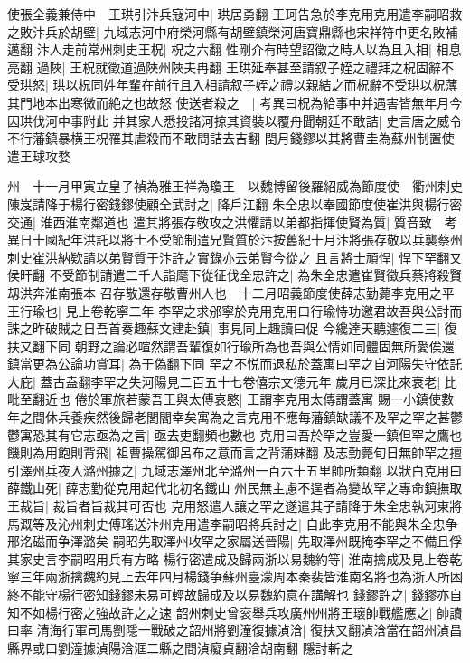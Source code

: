 使張全義兼侍中　王珙引汴兵寇河中|{
	珙居勇翻}
王珂告急於李克用克用遣李嗣昭救之敗汴兵於胡壁|{
	九域志河中府榮河縣有胡壁鎮榮河唐寶鼎縣也宋祥符中更名敗補邁翻}
汴人走前常州刺史王柷|{
	柷之六翻}
性剛介有時望詔徵之時人以為且入相|{
	相息亮翻}
過陜|{
	王柷就徵道過陜州陜夫冉翻}
王珙延奉甚至請叙子姪之禮拜之柷固辭不受珙怒|{
	珙以柷同姓年輩在前行且入相請叙子姪之禮以親結之而柷辭不受珙以柷薄其門地本出寒微而絶之也故怒}
使送者殺之　|{
	考異曰柷為給事中并遇害皆無年月今因珙伐河中事附此}
并其家人悉投諸河掠其資裝以覆舟聞朝廷不敢詰|{
	史言唐之威令不行藩鎮暴横王柷罹其虐殺而不敢問詰去吉翻}
閏月錢鏐以其將曹圭為蘇州制置使遣王球攻婺

州　十一月甲寅立皇子禎為雅王祥為瓊王　以魏博留後羅紹威為節度使　衢州刺史陳岌請降于楊行密錢鏐使顧全武討之|{
	降戶江翻}
朱全忠以奉國節度使崔洪與楊行密交通|{
	淮西淮南鄰道也}
遣其將張存敬攻之洪懼請以弟都指揮使賢為質|{
	質音致　考異日十國紀年洪託以將士不受節制遣兄賢質於汴按舊紀十月汴將張存敬以兵襲蔡州刺史崔洪納欵請以弟賢質于汴許之實錄亦云弟賢今從之}
且言將士頑悍|{
	悍下罕翻又侯旰翻}
不受節制請遣二千人詣麾下從征伐全忠許之|{
	為朱全忠遣崔賢徵兵蔡將殺賢刼洪奔淮南張本}
召存敬還存敬曹州人也　十二月昭義節度使薛志勤薨李克用之平王行瑜也|{
	見上卷乾寧二年}
李罕之求邠寧於克用克用曰行瑜恃功邀君故吾與公討而誅之昨破賊之日吾首奏趣蘇文建赴鎮|{
	事見同上趣讀曰促}
今纔達天聽遽復二三|{
	復扶又翻下同}
朝野之論必喧然謂吾輩復如行瑜所為也吾與公情如同體固無所愛俟還鎮當更為公論功賞耳|{
	為于偽翻下同}
罕之不悦而退私於蓋寓曰罕之自河陽失守依託大庇|{
	蓋古盍翻李罕之失河陽見二百五十七卷僖宗文德元年}
歲月已深比來衰老|{
	比毗至翻近也}
倦於軍旅若蒙吾王與太傅哀愍|{
	王謂李克用太傳謂蓋寓}
賜一小鎮使數年之間休兵養疾然後歸老閭閻幸矣寓為之言克用不應每藩鎮缺議不及罕之罕之甚鬱鬱寓恐其有它志亟為之言|{
	亟去吏翻頻也數也}
克用曰吾於罕之豈愛一鎮但罕之鷹也饑則為用飽則背飛|{
	祖曹操駕御呂布之意而言之背蒲妹翻}
及志勤薨旬日無帥罕之擅引澤州兵夜入潞州據之|{
	九域志澤州北至潞州一百六十五里帥所類翻}
以狀白克用曰薛鐵山死|{
	薛志勤從克用起代北初名鐵山}
州民無主慮不逞者為變故罕之專命鎮撫取王裁旨|{
	裁旨者旨裁其可否也}
克用怒遣人讓之罕之遂遣其子請降于朱全忠執河東將馬溉等及沁州刺史傅瑤送汴州克用遣李嗣昭將兵討之|{
	自此李克用不能與朱全忠争邢洺磁而争澤潞矣}
嗣昭先取澤州收罕之家屬送晉陽|{
	先取澤州既掩李罕之不備且俘其家史言李嗣昭用兵有方略}
楊行密遣成及歸兩浙以易魏約等|{
	淮南擒成及見上卷乾寧三年兩浙擒魏約見上去年四月楊錢争蘇州臺濛周本秦裴皆淮南名將也為浙人所困終不能守楊行密知錢鏐未易可輕故歸成及以易魏約意在講解也}
錢鏐許之|{
	錢鏐亦自知不如楊行密之強故許之之速}
韶州刺史曾衮舉兵攻廣州州將王瓌帥戰艦應之|{
	帥讀曰率}
清海行軍司馬劉隱一戰破之韶州將劉潼復據湞浛|{
	復扶又翻湞浛當在韶州湞昌縣界或曰劉潼據湞陽浛洭二縣之間湞癡貞翻浛胡南翻}
隱討斬之

